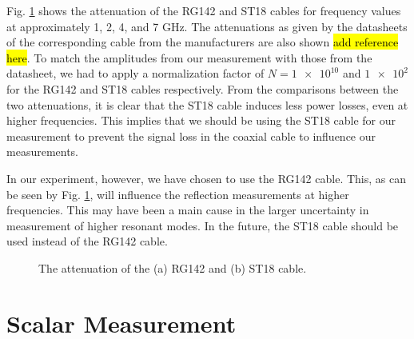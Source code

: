 \documentclass[a4paper]{report}
\numberwithin{equation}{section}
\begin{document}
Fig. \ref{fig:coax_atten} shows the attenuation of the RG142 and ST18 cables for frequency values at approximately 1, 2, 4,  and 7 $\si{\giga\hertz}$. 
The attenuations as given by the datasheets of the corresponding cable from the manufacturers are also shown \hl{add reference here}. To match the
amplitudes from our measurement with those from the datasheet, we had to apply a normalization factor of $N = \num{1e10}$ and $\num{1e2}$ for the 
RG142 and ST18 cables respectively. From the comparisons between the two attenuations, it is clear that the ST18 cable induces less power losses, 
even at higher frequencies. This implies that we should be using the ST18 cable for our measurement to prevent the signal loss in the coaxial
cable to influence our measurements. \par 

In our experiment, however, we have chosen to use the RG142 cable. This, as can be seen by Fig. \ref{fig:coax_atten}, will influence the reflection
measurements at higher frequencies. This may have been a main cause in the larger uncertainty in measurement of higher resonant modes. In the future,
the ST18 cable should be used instead of the RG142 cable. \par 

\begin{figure}[htb!]
	\centering
	\quad

	\caption{The attenuation of the (a) RG142 and (b) ST18 cable. }
	\label{fig:coax_atten}
\end{figure}


\section{Scalar Measurement}
\end{document}
